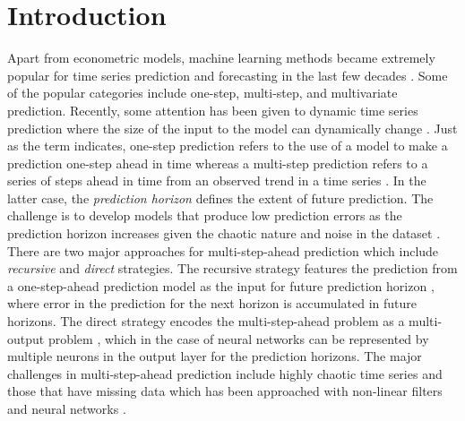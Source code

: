 \documentclass{ieeeaccess}
\begin{document}
\titlepgskip=-15pt

\maketitle

\section{Introduction}
\label{sec:introduction}  



Apart from econometric models, machine learning methods became extremely popular for time series  prediction and forecasting in the last few decades \cite{tealab2018time,cheng2015time,taieb2012review,ahmed2010empirical,Gooijer2006,li2005recent,hendry1983econometric}. Some of the popular categories include one-step, multi-step, and multivariate prediction. Recently, some attention has been given to dynamic time series prediction where the size of the input to the model can   dynamically change \cite{chandra2018co}. Just as the term indicates,  one-step prediction refers to the use of a model to make a prediction one-step ahead in time whereas a multi-step prediction refers to a series of steps ahead in time  from an observed trend in a time series 
\cite{sandya2013feature, chandra2012cooperative}. In the latter case, the \textit{prediction horizon}
defines the extent  of future prediction. The challenge is to develop models that 
produce low  
prediction errors as the prediction horizon increases  given the chaotic nature 
and noise in the dataset
\cite{taieb2015bias,chang2012reinforced,bone2002multi}. There are two major approaches  for  multi-step-ahead 
prediction which include  \textit{recursive} and  
\textit{direct}  strategies. The recursive strategy features the  prediction from 
a one-step-ahead prediction model  as the input for future
prediction horizon
\cite{zhang2013iterated,ben2012recursive}, where 
error in the prediction for the next horizon is accumulated in future horizons. 
The direct strategy encodes  the multi-step-ahead problem   as a multi-output problem   \cite{Sorjamaa2007,BenTaieb2010},  which in the case of neural networks can be represented by multiple neurons in the output layer for the prediction horizons. 
The major challenges in multi-step-ahead prediction include   highly chaotic time series 
and those that have missing data which has been approached  with non-linear filters and neural 
networks
\cite{Wu2014missingdate}.  

 
 
\end{document}
